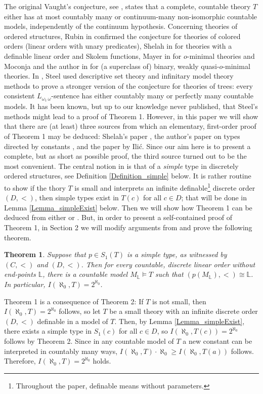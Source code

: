 \documentclass[12pt]{amsart}
\newtheorem{Theorem1}{Theorem}
\theoremstyle{definition}
\begin{document}
The original Vaught's conjecture, see \cite{Vaught}, states that  a complete, countable theory $T$ either has at most countably many or continuum-many non-isomorphic countable models, independently of the continuum hypothesis. Concerning theories of ordered structures, Rubin in \cite{Rubin} confirmed the conjecture for theories of colored orders (linear orders with unary predicates), Shelah in \cite{Sh} for theories with a definable linear order and Skolem functions, Mayer in \cite{Mayer} for $o$-minimal theories  and Moconja and the author in \cite{MT} for (a  superclass of) binary, weakly quasi-$o$-minimal theories. 
In \cite{Steel}, Steel used descriptive set theory and infinitary model theory methods to prove a stronger version of the conjecture for theories of trees: every consistent $L_{\omega_1\,\omega}$-sentence has either countably many or perfectly many countable models. It has been known, but up to our knowledge never published, that Steel's methods might lead to a proof of Theorem 1. 
However, in this paper we will show that there are (at least) three sources from which an elementary, first-order proof of Theorem 1 may be deduced: Shelah's paper \cite{Sh}, the author's paper on types directed by constants \cite{T}, and the paper \cite{DI} by Ili\'c.
Since our aim here is to present a complete, but as short as possible proof, the third source turned out to be the most convenient. 
The central notion in \cite{DI} is that of a  {\it simple} type in discretely ordered structures, see Definition \ref{Definition_simple} below. It is  rather routine to show if the thory $T$ is small and interprets an infinite definable\footnote{Throughout the paper, definable means without  parameters.} discrete order $(D,<)$, then simple types exist in $T(c)$ for all $c\in D$; that  will be done in Lemma \ref{Lemma_simpleExist} below. Then we will show how Theorem 1 can be deduced from either \cite{Sh} or \cite{T}. But, in order to present a self-contained proof of Theorem 1, 
in Section 2 we will modify arguments from \cite{DI} and prove the following theorem.

\begin{Theorem1}
Suppose that $p\in S_1(T)$ is a simple type, as witnessed by $(C,<)$ and $(D,<)$. Then for every countable, discrete linear order without end-points $\mathbb L$, there is a countable model $M_{\mathbb L}\models T$ such that $(p(M_{\mathbb L}),<)\cong \mathbb L$. In particular,   $I(\aleph_0,T)=2^{\aleph_0}$. 
\end{Theorem1}

Theorem 1 is a consequence of Theorem 2: If $T$ is not small, then  $I(\aleph_0,T)=2^{\aleph_0}$ follows, so let $T$ be a small theory with an infinite discrete  order $(D,<)$ definable in a model of $T$. Then, by Lemma \ref{Lemma_simpleExist}, there exists a simple type in $S_1(c)$ for all $c\in D$, so $I(\aleph_0,T(c))=2^{\aleph_0}$ follows by Theorem 2. Since in any countable model of $T$ a new constant can be interpreted in countably many ways,  $I(\aleph_0,T)\cdot\aleph_0\geq  I(\aleph_0,T(a)) $ follows.
Therefore, $I(\aleph_0,T)=2^{\aleph_0}$ holds.  
\end{document}
